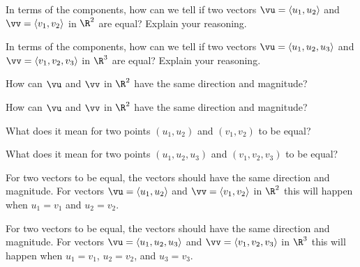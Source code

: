 \begin{activity}  \label{A:9.2.2}
    \ba
    \item In terms of the components, how can we tell if two vectors $\vu = \langle u_1, u_2 \rangle$ and $\vv = \langle v_1, v_2 \rangle$ in $\R^2$ are equal? Explain your reasoning.

    \item In terms of the components, how can we tell if two vectors $\vu = \langle u_1, u_2, u_3\rangle$ and $\vv = \langle v_1, v_2, v_3 \rangle$ in $\R^3$ are equal? Explain your reasoning.


    \ea

\end{activity}
\begin{smallhint}
\ba
\item How can $\vu$ and $\vv$ in $\R^2$ have the same direction and magnitude? 
\item How can $\vu$ and $\vv$ in $\R^2$ have the same direction and magnitude? 
\ea
\end{smallhint}
\begin{bighint}
\ba
\item What does it mean for two points $(u_1,u_2)$ and $(v_1,v_2)$ to be equal? 
\item What does it mean for two points $(u_1,u_2, u_3)$ and $(v_1,v_2,v_3)$ to be equal? 
\ea
\end{bighint}
\begin{activitySolution}
\ba
\item For two vectors to be equal, the vectors should have the same direction and magnitude. For vectors $\vu = \langle u_1, u_2 \rangle$ and $\vv = \langle v_1, v_2 \rangle$ in $\R^2$ this will happen when $u_1=v_1$ and $u_2=v_2$.
\item For two vectors to be equal, the vectors should have the same direction and magnitude. For vectors $\vu = \langle u_1, u_2, u_3\rangle$ and $\vv = \langle v_1, v_2, v_3 \rangle$ in $\R^3$ this will happen when $u_1=v_1$, $u_2=v_2$, and $u_3=v_3$.
\ea
\end{activitySolution}
\aftera
